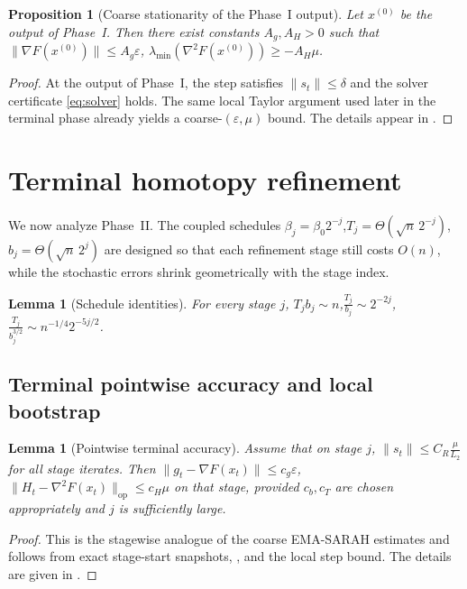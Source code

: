 \documentclass{article}
\theoremstyle{plain}
\newtheorem{proposition}[theorem]{Proposition}
\newtheorem{lemma}[theorem]{Lemma}
\theoremstyle{definition}
\theoremstyle{remark}
\begin{document}
\begin{proposition}[Coarse stationarity of the Phase~I output]\label{prop:coarse}
Let \(x^{(0)}\) be the output of Phase~I. Then there exist constants \(A_g,A_H>0\) such that
$
\|\nabla F(x^{(0)})\|\le A_g\varepsilon$,
$\lambda_{\min}(\nabla^2F(x^{(0)}))\ge -A_H\mu$.
\end{proposition}

\begin{proof}
At the output of Phase~I, the step satisfies \(\|s_t\|\le \delta\) and the solver certificate \eqref{eq:solver} holds. The same local Taylor argument used later in the terminal phase already yields a coarse-\((\varepsilon,\mu)\) bound. The details appear in .
\end{proof}

\section{Terminal homotopy refinement}\label{sec:terminal}

We now analyze Phase~II. The coupled schedules $\beta_j=\beta_0 2^{-j}$,$T_j=\Theta(\sqrt n\,2^{-j})$,$b_j=\Theta(\sqrt n\,2^j)$
are designed so that each refinement stage still costs \(O(n)\), while the stochastic errors shrink geometrically with the stage index.

\begin{lemma}[Schedule identities]\label{lem:schedule-main}
For every stage \(j\),
$
\textstyle T_j b_j \sim n$,$
\frac{T_j}{b_j}\sim 2^{-2j}$,$
\frac{T_j}{b_j^{3/2}}\sim n^{-1/4}2^{-5j/2}$.
\end{lemma}

\subsection{Terminal pointwise accuracy and local bootstrap}

\begin{lemma}[Pointwise terminal accuracy]\label{lem:pointwise-main}
Assume that on stage \(j\), $\|s_t\|\le C_R\frac{\mu}{L_2}$ for all stage iterates.
Then
$
\|g_t-\nabla F(x_t)\|\le c_g\varepsilon$,
$\|H_t-\nabla^2F(x_t)\|_{\mathrm{op}}\le c_H\mu$
on that stage, provided \(c_b,c_T\) are chosen appropriately and \(j\) is sufficiently large.
\end{lemma}

\begin{proof}
This is the stagewise analogue of the coarse EMA-SARAH estimates and follows from exact stage-start snapshots, , and the local step bound. The details are given in .
\end{proof}
\end{document}
